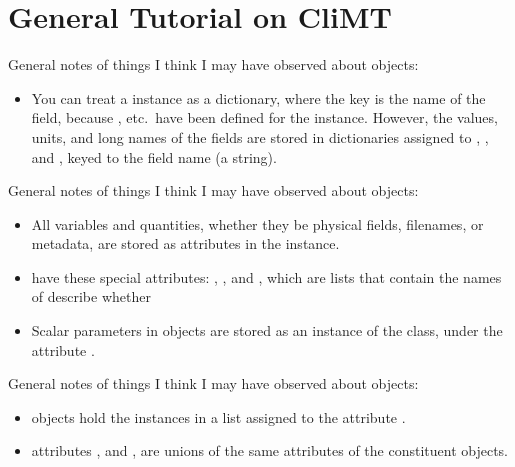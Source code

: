 %


%
\section{General Tutorial on CliMT}


General notes of things I think I may have observed about
 objects:
\begin{itemize}
\item You can treat a  instance as a dictionary, where
	the key is the name of the field, because ,
	etc.\ have been defined for the instance.  However, the values,
	units, and long names of the fields are stored in dictionaries
	assigned to , , and ,
	keyed to the field name (a string).
\end{itemize}


General notes of things I think I may have observed about
 objects:
\begin{itemize}
\item All variables and quantities, whether they be physical fields,
	filenames, or metadata,
	are stored as attributes in the  instance.
\item {} have these special attributes:
        ,
        ,
	and
        ,
	which are lists that contain the names of describe whether
\item Scalar parameters in  objects
	are stored as an instance of the 
	class, under the attribute .
\end{itemize}


General notes of things I think I may have observed about
 objects:
\begin{itemize}
\item {} objects hold the  instances
	in a list assigned to the attribute .
\item {} attributes
        ,
        and
	,
	are unions of the same attributes of the constituent
	 objects.
\end{itemize}






